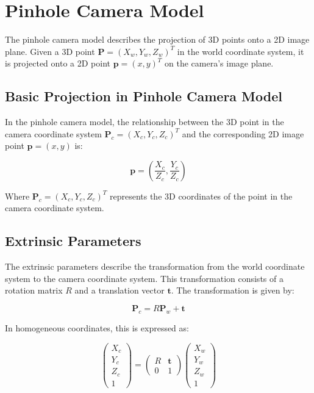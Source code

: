 \section{Pinhole Camera Model}

The pinhole camera model describes the projection of 3D points onto a 2D image plane. Given a 3D point \(\mathbf{P} = (X_w, Y_w, Z_w)^T\) in the world coordinate system, it is projected onto a 2D point \(\mathbf{p} = (x, y)^T\) on the camera's image plane.

\subsection{Basic Projection in Pinhole Camera Model}

In the pinhole camera model, the relationship between the 3D point in the camera coordinate system \(\mathbf{P}_c = (X_c, Y_c, Z_c)^T\) and the corresponding 2D image point \(\mathbf{p} = (x, y)\) is:

\[
\mathbf{p} = \left( \frac{X_c}{Z_c}, \frac{Y_c}{Z_c} \right)
\]

Where \(\mathbf{P}_c = (X_c, Y_c, Z_c)^T\) represents the 3D coordinates of the point in the camera coordinate system.

\subsection{Extrinsic Parameters}

The extrinsic parameters describe the transformation from the world coordinate system to the camera coordinate system. This transformation consists of a rotation matrix \(R\) and a translation vector \(\mathbf{t}\). The transformation is given by:

\[
\mathbf{P}_c = R \mathbf{P}_w + \mathbf{t}
\]

In homogeneous coordinates, this is expressed as:

\[
\begin{pmatrix}
	X_c \\
	Y_c \\
	Z_c \\
	1
\end{pmatrix}
=
\begin{pmatrix}
	R & \mathbf{t} \\
	0 & 1
\end{pmatrix}
\begin{pmatrix}
	X_w \\
	Y_w \\
	Z_w \\
	1
\end{pmatrix}
\]

